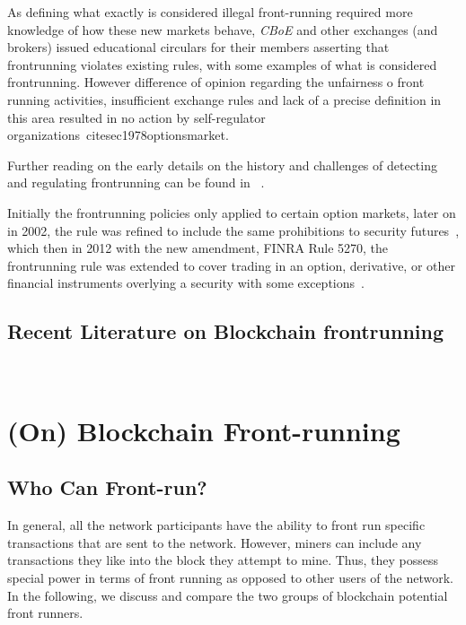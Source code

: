 As defining what exactly is considered illegal front-running required more knowledge of how these new markets behave, \textit{CBoE} and other exchanges (and brokers) issued educational circulars for their members asserting that frontrunning violates existing rules, with some examples of what is considered frontrunning. However difference of opinion regarding the unfairness o front running activities, insufficient exchange rules and lack of a precise definition in this area resulted in no action by self-regulator organizations~cite{sec1978optionsmarket}. 

Further reading on the early details on the history and challenges of detecting and regulating frontrunning can be found in~\cite{markham1988front} . %

Initially the frontrunning policies only applied to certain option markets, later on in 2002, the rule was refined to include the same prohibitions to security futures~\cite{finra_2002}, which then in 2012 with the new amendment, FINRA Rule 5270, the frontrunning rule was extended to cover trading in an option, derivative, or other financial instruments overlying a security with some exceptions~\cite{sec2012frontrunning, finra_2012}. 


\subsection{Recent Literature on Blockchain frontrunning}

~\cite{malinova2017market}
~\cite{aune2017footprints}
~\cite{breidenbach2018enter}






\section{(On) Blockchain Front-running}

\subsection{Who Can Front-run?}
\label{sec:who can frontrun?}

In general, all the network participants have the ability to front run specific transactions that are sent to the network. However, miners can include any transactions they like into the block they attempt to mine. Thus, they possess special power in terms of front running as opposed to other users of the network. In the following, we discuss and compare the two groups of blockchain potential front runners.

